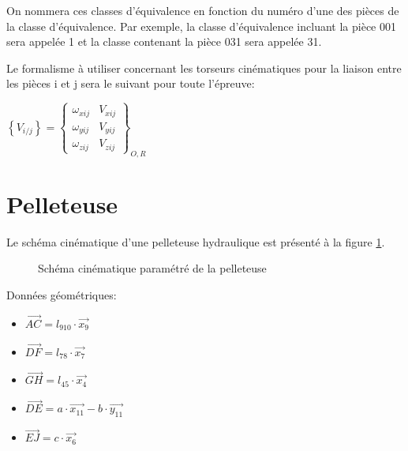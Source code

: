 
On nommera ces classes d'équivalence en fonction du numéro d'une des pièces de la classe d'équivalence. Par exemple, la classe d'équivalence incluant la pièce 001 sera appelée 1 et la classe contenant la pièce 031 sera appelée 31.


\newpage

Le formalisme à utiliser concernant les torseurs cinématiques pour la liaison entre les pièces i et j sera le suivant pour toute l'épreuve:
\begin{center}
$\left\{V_{i/j}\right\}=\left\{\begin{array}{cc}
\omega_{xij}&V_{xij}\\\omega_{yij}&V_{yij}\\\omega_{zij}&V_{zij}
\end{array}\right\}_{O,R}$
\end{center}



\section{Pelleteuse}

Le schéma cinématique d'une pelleteuse hydraulique est présenté à la figure \ref{pelleteuse_cin}.

\begin{figure}[ht!]
 \def\svgwidth{.8\linewidth}
 
 \caption{\label{pelleteuse_cin}Schéma cinématique paramétré de la pelleteuse}
\end{figure}

Données géométriques:
\begin{itemize}
 \item $\overrightarrow{AC}=l_{910}\cdot \overrightarrow{x_9}$
 \item $\overrightarrow{DF}=l_{78}\cdot \overrightarrow{x_7}$
 \item $\overrightarrow{GH}=l_{45}\cdot \overrightarrow{x_4}$
 \item $\overrightarrow{DE}=a\cdot \overrightarrow{x_{11}}-b\cdot \overrightarrow{y_{11}}$
 \item $\overrightarrow{EJ}=c\cdot \overrightarrow{x_6}$
\end{itemize}

